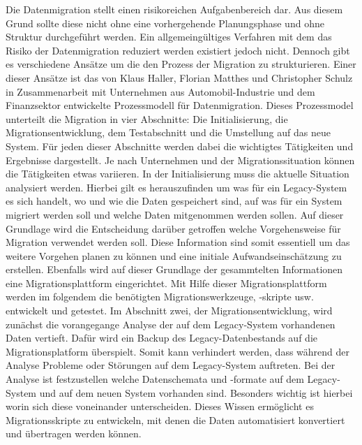 Die Datenmigration stellt einen risikoreichen Aufgabenbereich dar. Aus diesem Grund sollte diese nicht ohne eine vorhergehende Planungsphase und ohne Struktur durchgeführt werden. Ein allgemeingültiges Verfahren mit dem das Risiko der Datenmigration reduziert werden existiert jedoch nicht\citep[S.~3]{wuLawless-1997}. Dennoch gibt es verschiedene Ansätze um die den Prozess der Migration zu strukturieren. Einer dieser Ansätze ist das von Klaus Haller, Florian Matthes und Christopher Schulz in Zusammenarbeit mit Unternehmen aus Automobil-Industrie und dem Finanzsektor entwickelte Prozessmodell für Datenmigration\citep[S.~2f.]{klausMatthesSchulz-2012}. 
\lb
Dieses Prozessmodel unterteilt die Migration in vier Abschnitte: Die Initialisierung, die Migrationsentwicklung, dem Testabschnitt und die Umstellung auf das neue System. Für jeden dieser Abschnitte werden dabei die wichtigtes Tätigkeiten und Ergebnisse dargestellt\citep[S.~5f]{klausMatthesSchulz-2012}. Je nach Unternehmen und der Migrationssituation können die Tätigkeiten etwas variieren.
\lb
In der Initialisierung muss die aktuelle Situation analysiert werden. Hierbei gilt es herauszufinden um was für ein Legacy-System es sich handelt, wo und wie die Daten gespeichert sind, auf was für ein System migriert werden soll und welche Daten mitgenommen werden sollen.\citep[S.~7]{klausMatthesSchulz-2012} Auf dieser Grundlage wird die Entscheidung darüber getroffen welche Vorgehensweise für Migration verwendet werden soll. Diese Information sind somit essentiell um das weitere Vorgehen planen zu können und eine initiale Aufwandseinschätzung zu erstellen.\citep[S.~7]{klausMatthesSchulz-2012} Ebenfalls wird auf dieser Grundlage der gesammtelten Informationen eine Migrationsplattform eingerichtet. Mit Hilfe dieser Migrationsplattform werden im folgendem die benötigten Migrationswerkzeuge, -skripte usw. entwickelt und getestet.\citep[S.~7]{klausMatthesSchulz-2012}
\lb
Im Abschnitt zwei, der Migrationsentwicklung, wird zunächst die vorangegange Analyse der auf dem Legacy-System vorhandenen Daten vertieft. Dafür wird ein Backup des Legacy-Datenbestands auf die Migrationsplatform überspielt. Somit kann verhindert werden, dass während der Analyse Probleme oder Störungen auf dem Legacy-System auftreten.\citep[S.~7]{klausMatthesSchulz-2012} Bei der Analyse ist festzustellen welche Datenschemata und -formate auf dem Legacy-System und auf dem neuen System vorhanden sind. Besonders wichtig ist hierbei worin sich diese voneinander unterscheiden. Dieses Wissen ermöglicht es Migrationsskripte zu entwickeln, mit denen die Daten automatisiert konvertiert und übertragen werden können\citep[S.~7f.]{klausMatthesSchulz-2012}. 
